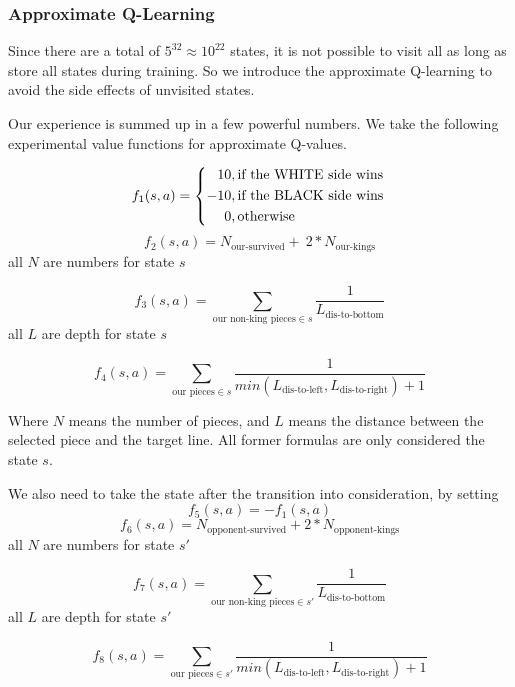 \subsubsection{Approximate Q-Learning}

Since there are a total of $5^{32}\approx10^{22}$ states, it is not possible to visit all as long as store all states during training. So we introduce the approximate Q-learning to avoid the side effects of unvisited states.

Our experience is summed up in a few powerful numbers. We take the following experimental value functions for approximate Q-values.

\begin{equation}
f_1(s, a) = \left\{\begin{aligned}
10 &, \text{if the WHITE side wins}\\
-10 &, \text{if the BLACK side wins}\\
0&,  \text{otherwise}\\
\end{aligned}\right. \\
\end{equation}
$$f_2(s,a)=N_{\text{our-survived}}  +\ 2*N_{\text{our-kings}}$$
all $N$ are numbers for state $s$

\begin{equation}
    f_3(s, a) = \sum\limits_{\text{our non-king pieces}\in s}\frac{1}{L_{\text{dis-to-bottom}}}
\label{f3}
\end{equation}
all $L$ are depth for state $s$

$$
f_4(s,a) = \sum\limits_{\text{our pieces}\in s}\frac{1}{min(L_{\text{dis-to-left}}, L_{\text{dis-to-right}})+1}
$$

Where $N$ means the number of pieces, and $L$ means the distance between the selected piece and the target line. All former formulas are only considered the state $s$.

We also need to take the state after the transition into consideration, by setting
$$f_5(s,a) = -f_1(s,a)$$
$$f_6(s,a)=N_{\text{opponent-survived}} + 2 * N_{\text{opponent-kings}}$$
all $N$ are numbers for state $s'$

\begin{equation}
    f_7(s, a) = \sum\limits_{\text{our non-king pieces}\in s'}\frac{1}{L_{\text{dis-to-bottom}}}
\end{equation}
all $L$ are depth for state $s'$

$$
f_8(s,a) = \sum\limits_{\text{our pieces}\in s'}\frac{1}{min(L_{\text{dis-to-left}}, L_{\text{dis-to-right}})+1}
$$

